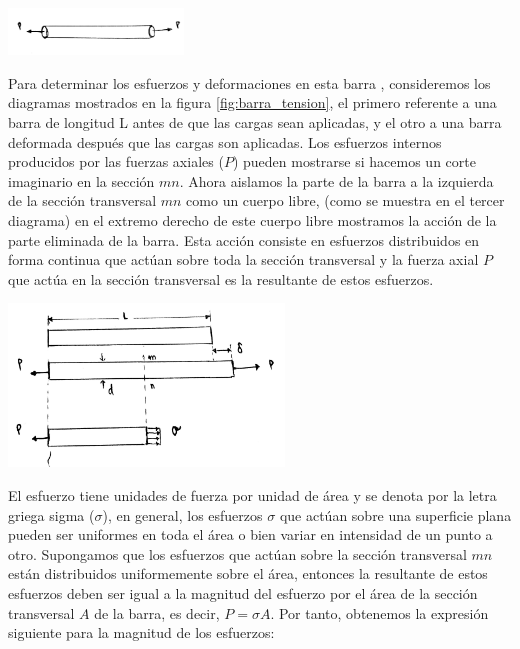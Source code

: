 \documentclass[12pt,letterpaper]{article}
\begin{document}
\begin{center}
\includegraphics[width=0.35\textwidth]{img/barra_prismatica.jpg}
\label{fig:barra_prismatica}
\end{center}

Para determinar los esfuerzos y deformaciones en esta barra , consideremos 
los diagramas mostrados en la figura \ref{fig:barra_tension}, el primero referente a una barra de longitud L antes de 
que las cargas sean aplicadas, y el otro a una barra deformada después que las cargas son aplicadas. Los esfuerzos 
internos producidos por las fuerzas axiales ($P$) pueden mostrarse si hacemos un corte imaginario en la sección 
$mn$. Ahora aislamos la parte de la barra a la izquierda de la sección transversal $mn$ como un cuerpo libre, 
(como se muestra en el tercer diagrama) en el extremo derecho de este cuerpo libre mostramos la acción de la 
parte eliminada de la barra. Esta acción consiste en esfuerzos distribuidos en forma continua que actúan sobre 
toda la sección transversal y la fuerza axial $P$ que actúa en la sección transversal es la resultante de estos 
esfuerzos.

\begin{center}
\includegraphics[width=0.55\textwidth]{img/barra_tension.jpg}
\label{fig:barra_tension}
\end{center}

El esfuerzo tiene unidades de fuerza por unidad de área y se denota por la letra griega sigma ($\sigma$), en general, 
los esfuerzos $\sigma$ que actúan sobre una superficie plana pueden ser uniformes en toda el área o bien variar 
en intensidad de un punto a otro. Supongamos que los esfuerzos que actúan sobre la sección transversal $mn$ están 
distribuidos uniformemente sobre el área, entonces la resultante de estos esfuerzos deben ser igual a la magnitud del 
esfuerzo por el área de la sección transversal $A$ de la barra, es decir, $P = \sigma A$. Por tanto, obtenemos la 
expresión siguiente para la magnitud de los esfuerzos:
\end{document}
